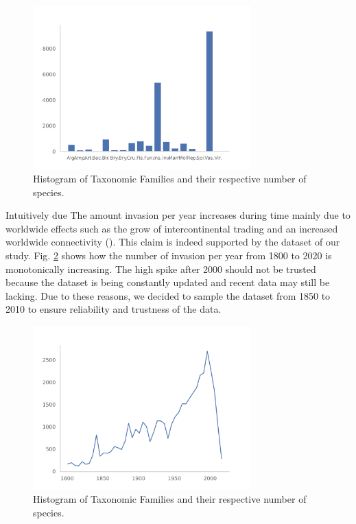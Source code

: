 \documentclass[mscthesis]{usiinfthesis}
\begin{document}
\begin{figure}[H]
    \centering
    \includegraphics[width=0.75\textwidth]{histogram_taxfam}
    \caption{Histogram of Taxonomic Families and their respective number of species.}
    \label{fig:hist_tax_fam}
\end{figure}

Intuitively due The amount invasion per year increases during time mainly due to worldwide effects such as the grow of intercontinental trading and an increased worldwide connectivity (\citet{intro:ecological}). This claim is indeed supported by the dataset of our study. Fig. \ref{fig:invasion_per_year} shows how the number of invasion per year from 1800 to 2020 is monotonically increasing. The high spike after 2000 should not be trusted because the dataset is being constantly updated and recent data may still be lacking. Due to these reasons, we decided to sample the dataset from 1850 to 2010 to ensure reliability and trustness of the data.

\begin{figure}[H]
    \centering
    \includegraphics[width=0.75\textwidth]{invasion_per_year.png}
    \caption{Histogram of Taxonomic Families and their respective number of species.}
    \label{fig:invasion_per_year}
\end{figure}
\end{document}
